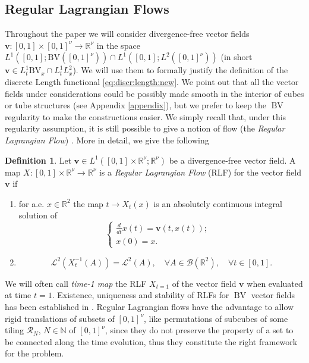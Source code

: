 \documentclass[12 pt]{article}
\theoremstyle{definition} \newtheorem{definition}{Definition}[section]
\theoremstyle{definition} \newtheorem{remark}[definition]{Remark}
\theoremstyle{plain} \newtheorem{lemma}[definition]{Lemma}
\theoremstyle{plain} \newtheorem{proposition}[definition]{Proposition}
\theoremstyle{plain} \newtheorem{theorem}[definition]{Theorem}
\theoremstyle{plain} \newtheorem{corollary}[definition]{Corollary}
\theoremstyle{definition} \newtheorem{example}[definition]{Example}
\theoremstyle{definition} \newtheorem{assumption}[definition]{Assumption}
\theoremstyle{definition} \newtheorem{conjecture}[definition]{Conjecture}
\DeclareMathOperator{\BV}{BV}
\newcommand{\N}{\mathbb{N}}
\newcommand{\1}{\mathbbm 1}
\numberwithin{equation}{section}
\begin{document}
\subsection{Regular Lagrangian Flows}\label{sect:RLF}
Throughout the paper we will consider divergence-free vector fields $\mathbf v:[0,1]\times [0,1]^\nu\rightarrow \mathbb R^\nu$ in the space $L^1([0,1];\text{BV}([0,1]^\nu))\cap L^1([0,1];L^2([0,1]^\nu))$ (in short $\mathbf v\in L^1_t\text{BV}_x\cap L^1_tL^2_x$). We will use them to formally justify the definition of the discrete Length functional \ref{eq:discr:length:new}. We point out that all the vector fields under considerations could be possibly made smooth in the interior of cubes or tube structures (see Appendix \ref{appendix}), but we prefer to keep the $\BV$ regularity to make the constructions easier. We simply recall that, under this regularity assumption, it is still possible to give a notion of flow (the \emph{Regular Lagrangian Flow}) \cite{Ambrosio:BV}.
 More in detail, we give the following
\begin{definition}
    Let $\mathbf v\in L^1([0,1]\times \mathbb R^\nu; \mathbb R^\nu)$ be a divergence-free vector field. A map $X:[0,1]\times \mathbb R^\nu\rightarrow \mathbb R^\nu$ is a \emph{Regular Lagrangian Flow} (RLF) for the vector field $\mathbf v$ if
    \begin{enumerate}
        \item for a.e. $x\in \mathbb R^2$ the map $t\rightarrow X_t(x)$ is an absolutely continuous integral solution of
        \begin{equation*}
            \begin{cases}
    \frac{d}{dt} x(t)=\mathbf v(t, x(t)); & \\
    x(0)=x.
    \end{cases}
        \end{equation*}
        \item 
        \begin{equation*}
            \mathcal L^2(X_t^{-1}(A))=\mathcal L^2(A),\quad\forall A\in\mathcal{B}(\mathbb R^2),\quad\forall t\in[0,1].
        \end{equation*}
    \end{enumerate}
\end{definition}
 We will often call \emph{time-1 map} the RLF $X_{t=1}$ of the vector field $\mathbf v$ when evaluated at time $t=1$. 
 Existence, uniqueness and stability of RLFs for $\BV$ vector fields has been established in \cite{Ambrosio:BV}.
Regular Lagrangian flows have the advantage to allow rigid translations of subsets of $[0,1]^\nu$, like permutations of subcubes of some tiling $\mathcal{R}_N$, $N\in\N$ of $[0,1]^\nu$, since they do not preserve the property of a set to be connected along the time evolution, thus they constitute the right framework for the problem. \\
\end{document}
